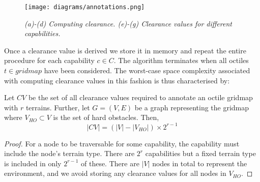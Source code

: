 \begin{figure}[htbp]
	\vspace{-9pt}
       \caption{\emph{(a)-(d) Computing clearance. (e)-(g) Clearance values for different capabilities.}}
       \begin{center}
                       \texttt{[image: diagrams/annotations.png]}
       \end{center}
       \label{aha-fig:annotations}
	\vspace{-6pt}
\end{figure}

Once a clearance value is derived we store it in memory and repeat the entire procedure for each capability $c \in C$.  
The algorithm terminates when all octiles $t \in gridmap$ have been considered. 
The worst-case space complexity associated with computing clearance values in this fashion is thus characterised by: 
\begin{lemma}
\label{aha-lemma:numannotations}
Let $CV$ be the set of all clearance values required to annotate an octile gridmap with $r$ terrains. Further, let $G = (V, E)$ be a graph representing the gridmap where $V_{HO} \subset V$ is the set of hard obstacles. Then, 
$$|CV| = (|V| - |V_{HO}|)\times 2^{r-1}$$
\end{lemma}

\begin{proof}
For a node to be traversable for some capability, the capability must include the node's terrain type. 
There are $2^{r}$ capabilities but a fixed terrain type is included in only $2^{r-1}$ of these. 
There are $|V|$ nodes in total to represent the environment, and we avoid storing any clearance values for all nodes in $V_{HO}$. 
\end{proof}

